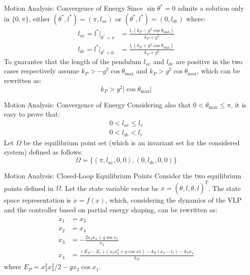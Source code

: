 \documentclass[10pt]{beamer}
\begin{document}
	\begin{frame}{Motion Analysis: Convergence of Energy}
		Since $\sin\theta^*=0$ admits a solution only in
    $\{0, \pi\}$, either $(\theta^*, l^*)=(\pi, l_{ue})$ or $(\theta^*,
    l^*)=(0, l_{de})$ where:
    \begin{align*}
      l_{ue} = l^*\rvert_{\theta^*=\pi} &=
      	\frac{l_r(k_P-g^2\cos\theta_{\max})}{k_P+g^2} \\
        l_{de} = l^*\rvert_{\theta^*=0} &=
        \frac{l_r(k_P+g^2\cos\theta_{\max})}{k_P+g^2}
    \end{align*}
		To guarantee that the length
    of the pendulum $l_{ue}$ and $l_{de}$ are positive in the two
    cases respectively assume $k_P>-g^2\cos\theta_{\max}$ and
    $k_P>g^2\cos\theta_{\max}$, which can be rewritten as:
    \begin{equation*}
      k_P > g^2 |\cos\theta_{\max}|
    \end{equation*}
	\end{frame}

	\begin{frame}{Motion Analysis: Convergence of Energy}
		Considering also that $0 < \theta_{\max} \le \pi$,
		it is easy to prove that:
    \begin{gather*}
        0 < l_{ue} \le l_r \\ 0 < l_{de} < l_r
    \end{gather*}
    Let $\Omega$ be the equilibrium point set (which is an
    invariant set for the considered system) defined as follows:
    \begin{equation*}
      \Omega = \{ (\pi, l_{ue}, 0, 0), (0, l_{de}, 0, 0) \}
    \end{equation*}
	\end{frame}

  \begin{frame}{Motion Analysis: Closed-Loop Equilibrium Points}
    Consider the two equilibrium points defined in $\Omega$.
    Let the state variable vector be $x = (\theta, l, \dot{\theta},
    \dot{l})^T$. The state space representation is $\dot{x} = f(x)$,
    which, considering the dynamics of the VLP and the controller based on
    partial energy shaping, can be rewritten as: 
    \begin{align*}
      \dot{x}_1 &= x_3 \\
      \dot{x}_2 &= x_4 \\
      \dot{x}_3 &= -\frac{2 x_3 x_4 + g\sin x_1}{x_2} \\
      \dot{x}_4 &= \frac{(E_P-E_r)(x_2 x_3^2 + g\cos x1)
				-k_P(x_2-l_r)-k_V x_4}{k_D}
    \end{align*}
    where $E_P=x_2^2 x_3^2 / 2 - g x_2 \cos x_1$.
  \end{frame}
\end{document}
